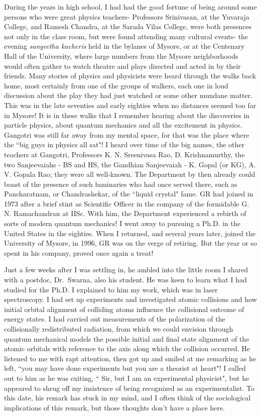During the years in high school, I had had the good fortune of being around some persons who were great physics teachers- Professors Srinivasan, at the Yuvaraja College, and Ramesh Chandra, at the Sarada Vilas College, were both presences not only in the class room, but were found attending many cultural events- the evening \textit{sangeetha kacheris} held in the bylanes of Mysore, or at the Centenary Hall of the University, where large numbers from the Mysore neighborhoods would often gather to watch theatre and plays directed and acted in by their friends. Many stories of physics and physicists were heard through the walks back home, most certainly from one of the groups of walkers, each one in loud discussion about the play they had just watched or some other mundane matter. This was in the late seventies and early eighties when no distances seemed too far in Mysore!  It is in these walks that I remember hearing about the discoveries in particle physics, about quantum mechanics and all the excitement in physics. Gangotri was still far away from my mental space, for that was the place where the ``big guys in physics all sat"! I heard over time of the big names, the other teachers at Gangotri, Professors K. N. Sreenivasa Rao, D. Krishnamurthy, the two Sanjeevaiahs - BS and HS, the Gandhian Sanjeevaiah - K. Gopal (or KG), A. V. Gopala Rao;  they were all well-known. The Department by then already could boast of the presence of such luminaries who had once served there, such as Pancharatnam, or Chandrashekar, of the ``liquid crystal" fame. GR had joined in 1973 after a brief stint as Scientific Officer in the company of the formidable G. N. Ramachandran at IISc. With him, the Department experienced a rebirth of sorts of modern quantum mechanics!  I went away to pursuing a Ph.D. in the United States in the eighties. When I returned, and several years later, joined the University of Mysore, in 1996, GR was on the verge of retiring. But the year or so spent in his company, proved once again a treat!
\newpage

Just a few weeks after I was settling in, he ambled into the little room I shared with a postdoc, Dr.\ Swarna, also his student. He was keen to learn what I had studied for the Ph.D. I explained to him my work, which was in laser spectroscopy. I had set up experiments and investigated atomic collisions and how initial orbital alignment of colliding atoms influence the collisional outcome of energy states. I had carried out measurements of the polarization of the collisionally redistributed radiation, from which we could envision through quantum mechanical models the possible initial and final state alignment of the atomic orbitals with reference to the axis along which the collision occurred. He listened to me with rapt attention, then got up and smiled at me remarking as he left, ``you may have done experiments but you are a theorist at heart"!  I called out to him as he was exiting, `` Sir, but I am an experimental physicist", but he appeared to shrug off my insistence of being recognized as an experimentalist. To this date, his remark has stuck in my mind, and I often think of the sociological implications of this remark, but those thoughts don't have a place here.

